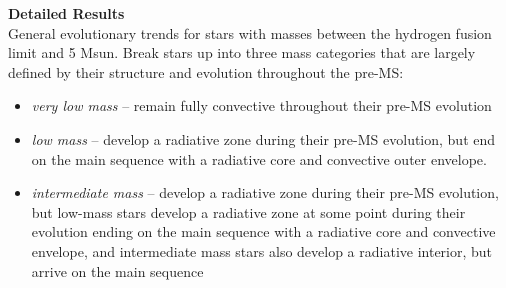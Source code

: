 \textbf{Detailed Results} \\
General evolutionary trends for stars with masses between the hydrogen fusion limit and 5 Msun. Break stars up into three mass categories that are largely defined by their structure and evolution throughout the pre-MS: 
\begin{itemize}
 \item[] {\it very low mass} -- remain fully convective throughout their pre-MS evolution
 \item[] {\it low mass} -- develop a radiative zone during their pre-MS evolution, but end on the main sequence with a radiative core and convective outer envelope.
 \item[] {\it intermediate mass} -- develop a radiative zone during their pre-MS evolution, but 
low-mass stars develop a radiative zone at some point during their evolution ending on the main sequence with a radiative core and convective envelope, and intermediate mass stars also develop a radiative interior, but arrive on the main sequence
\end{itemize}